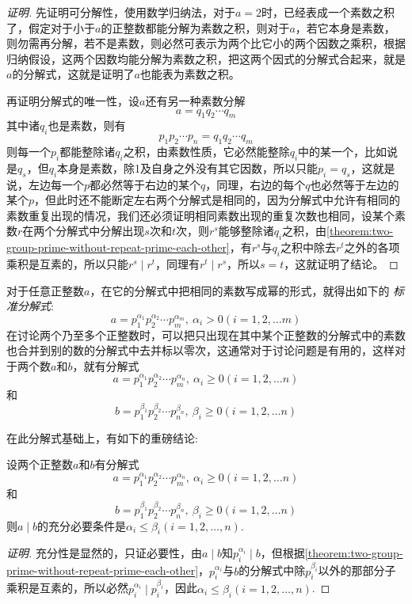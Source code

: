 \begin{proof}[证明]
  先证明可分解性，使用数学归纳法，对于$a=2$时，已经表成一个素数之积了，假定对于小于$a$的正整数都能分解为素数之积，则对于$a$，若它本身是素数，则勿需再分解，若不是素数，则必然可表示为两个比它小的两个因数之乘积，根据归纳假设，这两个因数均能分解为素数之积，把这两个因式的分解式合起来，就是$a$的分解式，这就是证明了$a$也能表为素数之积。

  再证明分解式的唯一性，设$a$还有另一种素数分解
  \[ a=q_1q_2 \cdots q_m \]
  其中诸$q_i$也是素数，则有
  \[ p_1p_2 \cdots p_n = q_1q_2 \cdots q_m \]
  则每一个$p_i$都能整除诸$q_i$之积，由素数性质，它必然能整除$q_i$中的某一个，比如说是$q_s$，但$q_i$本身是素数，除1及自身之外没有其它因数，所以只能$p_i=q_s$，这就是说，左边每一个$p$都必然等于右边的某个$q$，同理，右边的每个$q$也必然等于左边的某个$p$，但此时还不能断定左右两个分解式是相同的，因为分解式中允许有相同的素数重复出现的情况，我们还必须证明相同素数出现的重复次数也相同，设某个素数$r$在两个分解式中分解出现$s$次和$t$次，则$r^s$能够整除诸$q_i$之积，由\autoref{theorem:two-group-prime-without-repeat-prime-each-other}，有$r^s$与$q_i$之积中除去$r^t$之外的各项乘积是互素的，所以只能$r^s \mid r^t$，同理有$r^t \mid r^s$，所以$s=t$，这就证明了结论。
\end{proof}

对于任意正整数$a$，在它的分解式中把相同的素数写成幂的形式，就得出如下的 \emph{标准分解式}:
\[ a = p_1^{\alpha_1}p_2^{\alpha_2} \cdots p_m^{\alpha_m}, \  \alpha_i > 0 (i=1,2,\ldots m) \]
在讨论两个乃至多个正整数时，可以把只出现在其中某个正整数的分解式中的素数也合并到别的数的分解式中去并标以零次，这通常对于讨论问题是有用的，这样对于两个数$a$和$b$，就有分解式
\[ a = p_1^{\alpha_1}p_2^{\alpha_2} \cdots p_m^{\alpha_n}, \  \alpha_i \geqslant 0 (i=1,2,\ldots n) \]
和
\[ b = p_1^{\beta_1}p_2^{\beta_2} \cdots p_n^{\beta_n}, \  \beta_i \geqslant 0 (i=1,2,\ldots n) \]

在此分解式基础上，有如下的重磅结论:
\begin{theorem}
  \label{theorem:integer-division-with-prime-decompose}
  设两个正整数$a$和$b$有分解式
\[ a = p_1^{\alpha_1}p_2^{\alpha_2} \cdots p_m^{\alpha_n}, \  \alpha_i \geqslant 0 (i=1,2,\ldots n) \]
和
\[ b = p_1^{\beta_1}p_2^{\beta_2} \cdots p_n^{\beta_n}, \  \beta_i \geqslant 0 (i=1,2,\ldots n) \]
  则$a \mid b$的充分必要条件是$\alpha_i \leqslant \beta_i(i=1,2,\ldots,n)$.
\end{theorem}

\begin{proof}[证明]
  充分性是显然的，只证必要性，由$a \mid b$知$p_i^{\alpha_i} \mid b$，但根据\autoref{theorem:two-group-prime-without-repeat-prime-each-other}，$p_i^{\alpha_i}$与$b$的分解式中除$p_i^{\beta_i}$以外的那部分子乘积是互素的，所以必然$p_i^{\alpha_i} \mid p_i^{\beta_i}$，因此$\alpha_i \leqslant \beta_i(i=1,2,\ldots,n)$.
\end{proof}

